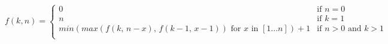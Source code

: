 \documentclass[tikz, border=5pt]{standalone}
\begin{document}
\begin{equation}
f(k, n) = 
\begin{cases}
  0 & \text{if } n = 0 \\
  n & \text{if } k = 1 \\
  min(max(f(k \text{, } n - x) \text{, } f(k - 1 \text{, } x - 1))
  \text{ for } x \text{ in } [1 ... n]) + 1 & \text{if } n > 0 \text{ and } k > 1 \\
\end{cases}
\end{equation}
\end{document}
